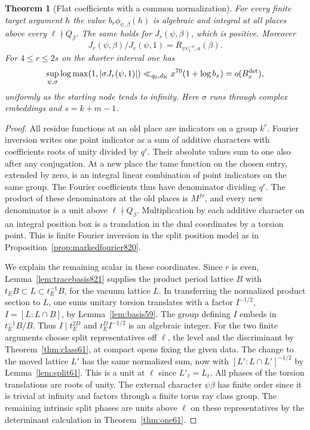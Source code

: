 \documentclass[a4paper,11pt]{article}
\newtheorem{theorem}[proposition]{Theorem}
\theoremstyle{definition}
\theoremstyle{remark}
\numberwithin{equation}{section}
\begin{document}
\begin{theorem}[Flat coefficients with a common normalization]
\leavevmode\label{thm:flattorus853}
For every finite target argument \(h\) the value
\(b_r\phi_{\psi,\beta}(h)\) is algebraic and integral at all
places above every \(\ell\nmid Q_\beta\). The same holds for
\(J_r(\psi,\beta)\), which is positive. Moreover
\[
  J_r(\psi,\beta)/J_r(\psi,1)
       =R_{\psi\upsilon_1^{-a},a}(\beta).
\]
For \(4\le r\le 2s\) on the shorter interval one has
\[
 \sup_{\psi,\sigma}\log\max(1,|\sigma J_r(\psi,1)|)
          \ll_{q_0,d_{\rm K}} x^{70}(1+\log b_x)
          =o(B_x^{\rm det}),
\]
uniformly as the starting node tends to infinity. Here \(\sigma\)
runs through complex embeddings and \(s=k+m-1\).
\end{theorem}
\begin{proof}
All residue functions at an old place are indicators on
a group \(k^r\). Fourier inversion writes one point indicator
as a sum of additive characters with coefficients roots of
unity divided by \(q^r\). Their absolute values sum to one
also after any conjugation. At a new place the tame function
on the chosen entry, extended by zero, is an integral linear
combination of point indicators on the same group. The
Fourier coefficients thus have denominator dividing \(q^r\).
The product of these denominators at the old places is
\(M^{fr}\), and every new denominator is a unit above
\(\ell\nmid Q_\beta\). Multiplication by each additive
character on an integral position box is a translation in
the dual coordinates by a torsion point. This is finite
Fourier inversion in the split position model as in
Proposition~\ref{prop:markedfourier820}.

We explain the remaining scalar in these coordinates. Since
\(r\) is even, Lemma~\ref{lem:tracebasis821} supplies the
product period lattice \(B\) with
\(t_E B\subset L\subset t_E^{-1}B\), for the vacuum lattice
\(L\). In transferring the normalized product section to
\(L\), one sums unitary torsion translates with a factor
\(I^{-1/2}\), \(I=[L:L\cap B]\), by Lemma~\ref{lem:basis59}.
The group defining \(I\) embeds in \(t_E^{-1}B/B\). Thus
\(I\mid t_E^{2D}\) and \(t_E^D I^{-1/2}\) is an algebraic
integer. For the two finite arguments choose split
representatives off \(\ell\), the level and the discriminant
by Theorem~\ref{thm:class61}, at compact opens fixing the
given data. The change to the moved lattice \(L'\) has the
same normalized sum, now with
\([L':L\cap L']^{-1/2}\) by Lemma~\ref{lem:split61}. This is a
unit at \(\ell\) since \(L'_\ell=L_\ell\). All phases of the
torsion translations are roots of unity. The external
character \(\psi\beta\) has finite order since it is trivial
at infinity and factors through a finite torus ray class
group. The remaining intrinsic split phases are units above
\(\ell\) on these representatives by the determinant calculation
in Theorem~\ref{thm:one61}.


\end{proof}
\end{document}
